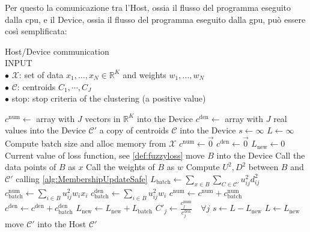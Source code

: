 \begin{toDo}
	\noindent Per questo la comunicazione tra l'Host, ossia il flusso del programma eseguito dalla \gls{cpu}, e il Device, ossia il flusso del programma eseguito dalla \gls{gpu}, può essere così semplificata:


	\begin{algorithm}[H]
		\caption{Host/Device communication\\
			\textsc{INPUT}\\
			$\bullet$ $\mathcal{X}$: set of data $x_1,\ldots,x_N\in\mathbb{R}^K$ and weights $w_1,\ldots,w_N$\\
			$\bullet$ $\mathcal{C}$: centroids $C_1,\cdots,C_J$\\
			$\bullet$ stop: stop criteria of the clustering (a positive value)
		}
		\begin{algorithmic}[1]
				\State $c^\text{num} \gets $ array with $J$ vectors in $\mathbb{R}^K$ into the Device
				\State $c^\text{den} \gets $ array with $J$ real values into the Device
				\State $\mathcal{C}'$ a copy of centroids $\mathcal{C}$ into the Device
				\State $s \gets \infty$
				\State $L \gets \infty$
					\State Compute batch size and alloc memory from $\mathcal{X}$
					\State $c^\text{num}\gets \vec{0}$
					\State $c^\text{den}\gets \vec{0}$
					\State $L_\text{new} \gets 0$ \Comment Current value of loss function, see \cref{def:fuzzyloss}
						\State move $B$ into the Device
						\State Call the data points of $B$ as $x$
						\State Call the weights of $B$ as $w$
						\State Compute $U^2, D^2$ between $B$ and $\mathcal{C}'$ \Comment calling \cref{alg:MembershipUpdateSafe}
						\State $L_\text{batch} \gets \sum_{x\in B}\sum_{C\in\mathcal{C'}}u_{ij}^2d_{ij}^2$
						\State $c^\text{num}_\text{batch} \gets \sum_{i\in B} u_{ij}^2w_ix_i$
						\State $c^\text{den}_\text{batch} \gets \sum_{i\in B} u_{ij}^2w_i$
						\State $c^\text{num} \gets c^\text{num} + c^\text{num}_\text{batch}$
						\State $c^\text{den} \gets c^\text{den} + c^\text{den}_\text{batch}$
						\State $L_\text{new} \gets L_\text{new} + L_\text{batch}$
					\EndFor
					\State $C'_j \gets \frac{c^\text{num}_j}{ c^\text{den}_j} \quad \forall j$
					\State $s \gets L - L_\text{new}$
					\State $L \gets L_\text{new}$
				\EndWhile
				\State move $\mathcal{C}'$ into the Host
				\State \Return $\mathcal{C}'$
			\EndFunction
			\label{alg:FCMwrapper}
		\end{algorithmic}
	\end{algorithm}


\end{toDo}
